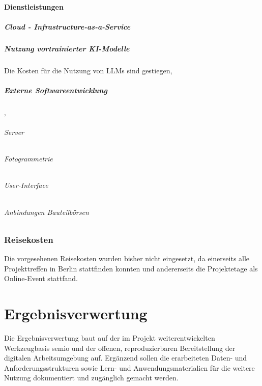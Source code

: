 \documentclass[type=zwischenbericht,theme=dark]{zukunftbau}
\begin{document}
\subsection{Dienstleistungen}


\subsubsection{Cloud - Infrastructure-as-a-Service}
\subsubsection{Nutzung vortrainierter KI-Modelle}
Die Kosten für die Nutzung von LLMs sind gestiegen, 

\subsubsection{Externe Softwareentwicklung}
\begin{SemioNest}‚
\paragraph{Server}
\paragraph{Fotogrammetrie}
\paragraph{User-Interface}
\paragraph{Anbindungen Bauteilbörsen}
\end{SemioNest}

\section{Reisekosten}

Die vorgesehenen Reisekosten wurden bisher nicht eingesetzt, da einerseits alle Projekttreffen in Berlin stattfinden konnten und andererseits die Projektetage als Online-Event stattfand.

\part{Ergebnisverwertung}

Die Ergebnisverwertung baut auf der im Projekt weiterentwickelten Werkzeugbasis semio und der offenen, reproduzierbaren Bereitstellung der digitalen Arbeitsumgebung auf. Ergänzend sollen die erarbeiteten Daten- und Anforderungsstrukturen sowie Lern- und Anwendungsmaterialien für die weitere Nutzung dokumentiert und zugänglich gemacht werden.
\end{document}
